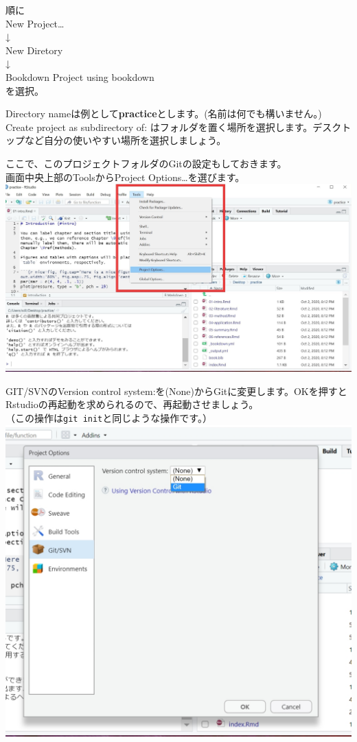 \documentclass[
]{book}
\begin{document}
順に\\
New Project\ldots{}\\
↓\\
New Diretory\\
↓\\
Bookdown Project using bookdown\\
を選択。

Directory nameは例として\textbf{practice}とします。(名前は何でも構いません。)\\
Create project as subdirectory of: はフォルダを置く場所を選択します。デスクトップなど自分の使いやすい場所を選択しましょう。

ここで、このプロジェクトフォルダのGitの設定もしておきます。\\
画面中央上部のToolsからProject Options\ldots を選びます。
\includegraphics{pics/git1.jpg}

GIT/SVNのVersion control system:を(None)からGitに変更します。OKを押すとRstudioの再起動を求められるので、再起動させましょう。\\
（この操作は\texttt{git\ init}と同じような操作です。）
\includegraphics{pics/git2.jpg}
\end{document}
